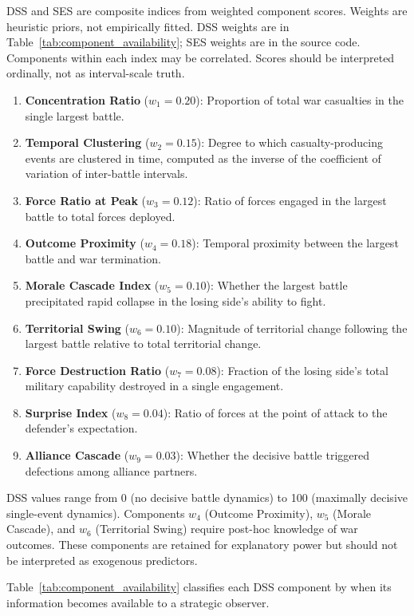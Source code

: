 DSS and SES are composite indices from weighted component scores. Weights are heuristic priors, not empirically fitted. DSS weights are in Table~\ref{tab:component_availability}; SES weights are in the source code. Components within each index may be correlated. Scores should be interpreted ordinally, not as interval-scale truth.

\begin{enumerate}
    \item \textbf{Concentration Ratio} ($w_1 = 0.20$): Proportion of total war casualties in the single largest battle.
    \item \textbf{Temporal Clustering} ($w_2 = 0.15$): Degree to which casualty-producing events are clustered in time, computed as the inverse of the coefficient of variation of inter-battle intervals.
    \item \textbf{Force Ratio at Peak} ($w_3 = 0.12$): Ratio of forces engaged in the largest battle to total forces deployed.
    \item \textbf{Outcome Proximity} ($w_4 = 0.18$): Temporal proximity between the largest battle and war termination.
    \item \textbf{Morale Cascade Index} ($w_5 = 0.10$): Whether the largest battle precipitated rapid collapse in the losing side's ability to fight.
    \item \textbf{Territorial Swing} ($w_6 = 0.10$): Magnitude of territorial change following the largest battle relative to total territorial change.
    \item \textbf{Force Destruction Ratio} ($w_7 = 0.08$): Fraction of the losing side's total military capability destroyed in a single engagement.
    \item \textbf{Surprise Index} ($w_8 = 0.04$): Ratio of forces at the point of attack to the defender's expectation.
    \item \textbf{Alliance Cascade} ($w_9 = 0.03$): Whether the decisive battle triggered defections among alliance partners.
\end{enumerate}

DSS values range from 0 (no decisive battle dynamics) to 100 (maximally decisive single-event dynamics). Components $w_4$ (Outcome Proximity), $w_5$ (Morale Cascade), and $w_6$ (Territorial Swing) require post-hoc knowledge of war outcomes. These components are retained for explanatory power but should not be interpreted as exogenous predictors.

Table~\ref{tab:component_availability} classifies each DSS component by when its information becomes available to a strategic observer.

